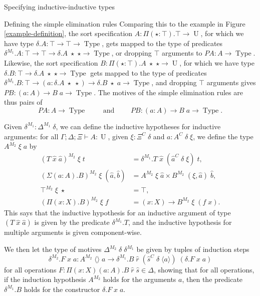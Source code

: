 \documentclass[runningheads]{llncs}
\DeclareMathOperator{\USet}{Type}
\DeclareMathOperator{\UU}{U}
\newcommand{\tac}{\vdash}
\newcommand{\PA}{\mathit{PA}}
\newcommand{\PB}{\mathit{PB}}
\def\emptytuple{\langle\rangle}
\begin{document}
{\begin{section}{Specifying inductive-inductive types}
\begin{subsection}{\label{simple-elim-section}Defining the simple elimination rules}
Comparing this to the example in Figure \ref{example-definition}, the sort specification $A : \Pi(\star : \top).\top \to \UU$, for which we have type $\delta.A : \top \to \top \to \USet$, gets mapped to the type of predicates $\delta^{M_1}.A : \top \to \top \to \delta.A\;\star\;\star \to \USet$, or dropping $\top$ arguments to $\PA : A \to \USet$. Likewise, the sort specification $B : \Pi(\star : \top).A\;\star\;\star \to \UU$, for which we have type $\delta.B : \top \to \delta.A\;\star\;\star \to \USet$ gets mapped to the type of predicates $\delta^{M_1}.B : \top \to (a : \delta.A\;\star\;\star) \to \delta.B\;\star\;a \to \USet$, and dropping $\top$ arguments gives $\PB : (a : A) \to B\;a \to \USet$. The motives of the simple elimination rules are thus pairs of \[\PA : A \to \USet\qquad\text{ and }\qquad \PB : (a : A) \to B\;a \to \USet.\]

\begin{definition}
Given $\delta^{M_1} : \Delta^{M_1}\;\delta$, we can define the inductive hypotheses for inductive arguments: for all $\Gamma ; \Delta ; \Xi \tac A : \UU$, given $\xi : \Xi^C\;\delta$ and $a : A^C\;\delta\;\xi$, we define the type $A^{M_2}\;\xi\;a$ by
\begin{align*}
(T\;\hat{x}\;\hat{a})^{M_2}\;\xi\;t &= \delta^{M_1}.T\;\hat{x}\;(\hat{a}^{C}\;\delta\;\xi)\;t,\\
(\Sigma(a : A).B)^{M_2}\;\xi\;(\hat{a},\hat{b}) &= A^{M_2}\;\xi\;\hat{a} \times B^{M_2}\;(\xi,\hat{a})\;\hat{b},\\
\top^{M_2}\;\xi\;\star &= \top,\\
(\Pi(x : X).B)^{M_2}\;\xi\;f &= (x : X) \to B^{M_2}\;\xi\;(f\;x).
\end{align*}
This says that the inductive hypothesis for an inductive argument of type $(T\;\hat{x}\;\hat{a})$ is given by the predicate $\delta^{M_1}.T$, and the inductive hypothesis for multiple arguments is given component-wise.

We then let the type of motives $\Delta^{M_2}\;\delta\;\delta^{M_1}$ be given by tuples of induction steps \[\delta^{M_2}.F\;x\;a : A^{M_2}\;\emptytuple\;a\to \delta^{M_1}.B\; \hat{r}\;(\hat{s}^C\;\delta\;\langle a \rangle)\;(\delta.F\;x\;a)\] for all operations $F : \Pi(x : X)(a : A).B\;\hat{r}\;\hat{s} \in \Delta$, showing that for all operations, if the induction hypothesis $A^{M_2}$ holds for the arguments $a$, then the predicate $\delta^{M_1}.B$ holds for the constructor $\delta.F\;x\;a$.
\end{definition}


\end{subsection}
\end{section}}
\end{document}
